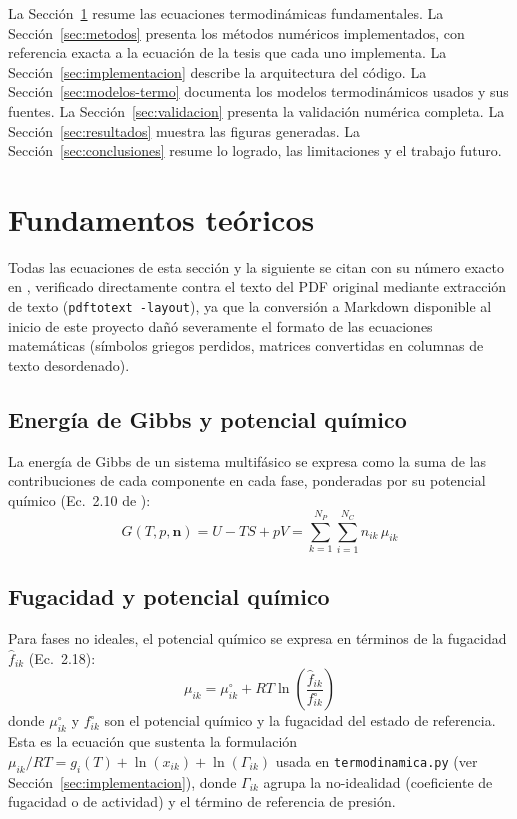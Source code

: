 \documentclass[11pt,a4paper]{article}
\begin{document}
La Sección~\ref{sec:fundamentos} resume las ecuaciones termodinámicas
fundamentales. La Sección~\ref{sec:metodos} presenta los métodos
numéricos implementados, con referencia exacta a la ecuación de la
tesis que cada uno implementa. La Sección~\ref{sec:implementacion}
describe la arquitectura del código. La
Sección~\ref{sec:modelos-termo} documenta los modelos termodinámicos
usados y sus fuentes. La Sección~\ref{sec:validacion} presenta la
validación numérica completa. La Sección~\ref{sec:resultados} muestra
las figuras generadas. La Sección~\ref{sec:conclusiones} resume lo
logrado, las limitaciones y el trabajo futuro.

\section{Fundamentos teóricos}
\label{sec:fundamentos}

Todas las ecuaciones de esta sección y la siguiente se citan con su
número exacto en \citet{tsanas2018}, verificado directamente contra el
texto del PDF original mediante extracción de texto
(\texttt{pdftotext -layout}), ya que la conversión a Markdown
disponible al inicio de este proyecto dañó severamente el formato de
las ecuaciones matemáticas (símbolos griegos perdidos, matrices
convertidas en columnas de texto desordenado).

\subsection{Energía de Gibbs y potencial químico}

La energía de Gibbs de un sistema multifásico se expresa como la suma
de las contribuciones de cada componente en cada fase, ponderadas por
su potencial químico (Ec.~2.10 de \citet{tsanas2018}):
\begin{equation}
  G(T,p,\mathbf{n}) = U - TS + pV = \sum_{k=1}^{N_P}\sum_{i=1}^{N_C} n_{ik}\,\mu_{ik}
  \label{eq:2.10}
\end{equation}

\subsection{Fugacidad y potencial químico}

Para fases no ideales, el potencial químico se expresa en términos de
la fugacidad $\hat f_{ik}$ (Ec.~2.18):
\begin{equation}
  \mu_{ik} = \mu_{ik}^{\circ} + RT \ln\!\left(\frac{\hat f_{ik}}{f_{ik}^{\circ}}\right)
  \label{eq:2.18}
\end{equation}
donde $\mu_{ik}^{\circ}$ y $f_{ik}^{\circ}$ son el potencial químico y
la fugacidad del estado de referencia. Esta es la ecuación que
sustenta la formulación $\mu_{ik}/RT = g_i(T) + \ln(x_{ik}) +
\ln(\Gamma_{ik})$ usada en \texttt{termodinamica.py} (ver
Sección~\ref{sec:implementacion}), donde $\Gamma_{ik}$ agrupa la
no-idealidad (coeficiente de fugacidad o de actividad) y el término de
referencia de presión.
\end{document}
